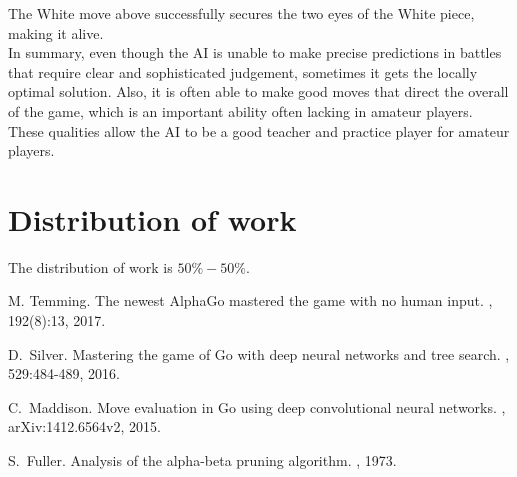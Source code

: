 \documentclass[11pt]{article}
\begin{document}
The White move above successfully secures the two eyes of the White piece, making it alive. \\
In summary, even though the AI is unable to make precise predictions in battles that require clear and sophisticated judgement, sometimes it gets the locally optimal solution. Also, it is often able to make good moves that direct the overall of the game, which is an important ability often lacking in amateur players. These qualities allow the AI to be a good teacher and practice player for amateur players. 
\section*{Distribution of work} The distribution of work is $50\% - 50\%$.
\newpage

\begin{thebibliography}{99}

\newblock M. Temming.
\newblock The newest AlphaGo mastered the game with no human input.
, 192(8):13, 2017.

\newblock D.~Silver.
\newblock Mastering the game of Go with deep neural networks and tree search.
, 529:484-489, 2016.

\newblock C.~Maddison.
\newblock Move evaluation in Go using deep convolutional neural networks.
, arXiv:1412.6564v2, 2015.

\newblock S.~Fuller.
\newblock Analysis of the alpha-beta pruning algorithm. 
, 1973.

\end{thebibliography}
\end{document}

